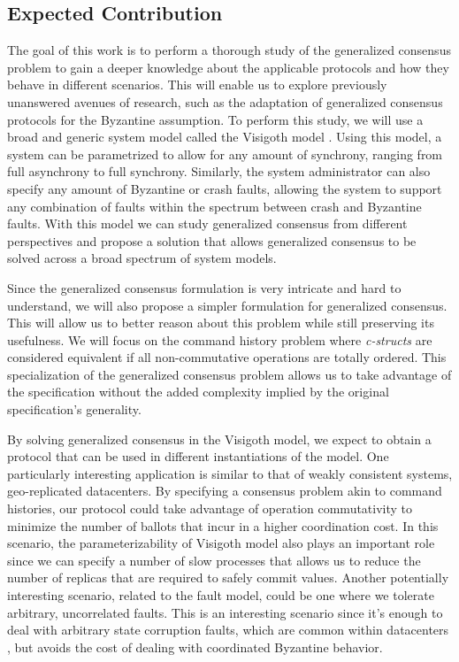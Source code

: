 \documentclass[runningheads,a4paper]{llncs}
\begin{document}
\subsection{Expected Contribution}
The goal of this work is to perform a thorough study of the generalized consensus problem to gain a deeper knowledge about the applicable protocols and how they behave in different scenarios. This will enable us to explore previously unanswered avenues of research, such as the adaptation of generalized consensus protocols for the Byzantine assumption. To perform this study, we will use a broad and generic system model called the Visigoth model \cite{Porto2015}. Using this model, a system can be parametrized to allow for any amount of synchrony, ranging from full asynchrony to full synchrony. Similarly, the system administrator can also specify any amount of Byzantine or crash faults, allowing the system to support any combination of faults within the spectrum between crash and Byzantine faults. With this model we can study generalized consensus from different perspectives and propose a solution that allows generalized consensus to be solved across a broad spectrum of system models. \par 
Since the generalized consensus formulation is very intricate and hard to understand, we will also propose a simpler formulation for generalized consensus. This will allow us to better reason about this problem while still preserving its usefulness. We will focus on the command history problem where \textit{c-structs} are considered equivalent if all non-commutative operations are totally ordered. This specialization of the generalized consensus problem allows us to take advantage of the specification without the added complexity implied by the original specification's generality. \par
By solving generalized consensus in the Visigoth model, we expect to obtain a protocol that can be used in different instantiations of the model. One particularly interesting application is similar to that of weakly consistent systems, geo-replicated datacenters. By specifying a consensus problem akin to command histories, our protocol could take advantage of operation commutativity to minimize the number of ballots that incur in a higher coordination cost. In this scenario, the parameterizability of Visigoth model also plays an important role since we can specify a number of slow processes that allows us to reduce the number of replicas that are required to safely commit values. Another potentially interesting scenario, related to the fault model, could be one where we tolerate arbitrary, uncorrelated faults. This is an interesting scenario since it's enough to deal with arbitrary state corruption faults, which are common within datacenters \cite{AmazonS32}, but avoids the cost of dealing with coordinated Byzantine behavior.
\end{document}

